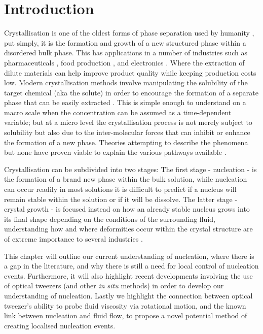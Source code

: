 \chapter{Introduction}
Crystallisation is one of the oldest forms of phase 
separation used by humanity \cite{Schoen1956}, put 
simply, it is the formation and growth of a new 
structured phase within a disordered bulk phase. 
This has applications in a number of industries such 
as pharmaceuticals \cite{Gao2017}, food production 
\cite{Hartel2002}, and electronics \cite{Myerson2002}. 
Where the extraction of dilute materials can help 
improve product quality while keeping production costs 
low. Modern crystallisation methods involve manipulating 
the solubility of the target chemical (aka the solute) 
in order to encourage the formation of a separate phase
that can be easily extracted \cite{Gao2017}. This is 
simple enough to understand on a macro scale when the 
concentration can be assumed as a time-dependent 
variable; but at a micro level the crystallisation process
is not merely subject to solubility but also due to 
the inter-molecular forces that can inhibit or enhance 
the formation of a new phase. Theories attempting to describe
the phenomena but none have proven viable to explain the 
various pathways available \cite{Fu2021}. 

Crystallisation can be subdivided into two stages: The first 
stage - nucleation - is the formation of a brand new phase 
within the bulk solution, while nucleation can occur readily 
in most solutions it is difficult to predict if a nucleus 
will remain stable within the solution or if it will be 
dissolve. The latter stage - crystal growth - is focused 
instead on how an already stable nucleus grows into its 
final shape depending on the conditions of the surrounding
fluid, understanding how and where deformities occur within
the crystal structure are of extreme importance to several 
industries \cite{Gao2017,Myerson2002}.

This chapter will outline our current understanding of nucleation, 
where there is a gap in the literature, and why there is still a 
need for local control of nucleation events. Furthermore, it will 
also highlight recent developments involving the use of optical 
tweezers (and other \textit{in situ } methods) in order to develop 
our understanding of nucleation. Lastly we highlight the connection 
between optical tweezer's ability to probe fluid viscosity via 
rotational motion, and the known link between nucleation and fluid 
flow, to propose a novel potential method of creating localised 
nucleation events.
 
